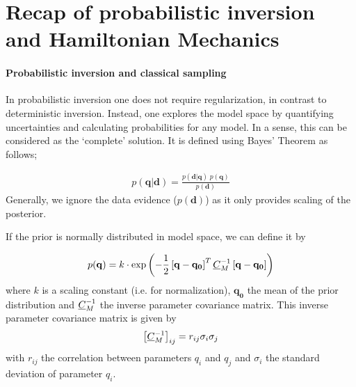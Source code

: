 \section{Recap of probabilistic inversion and Hamiltonian Mechanics}

\paragraph{Probabilistic inversion and classical sampling}
In probabilistic inversion one does not require regularization, in contrast to deterministic inversion. Instead, one explores the model space by quantifying uncertainties and calculating probabilities for any model. In a sense, this can be considered as the `complete' solution. It is defined using Bayes' Theorem as follows;

\begin{gather}
	p(\mathbf{q}|\mathbf{d}) = \frac{p(\mathbf{d}|\mathbf{q})\;p(\mathbf{q})}{ p(\mathbf{d})}
\end{gather}
Generally, we ignore the data evidence ($p(\mathbf{d})$) as it only provides scaling of the posterior.

If the prior is normally distributed in model space, we can define it by

\begin{gather}
	p(\mathbf{q}) = k \cdot \exp{\left( -\frac{1}{2} \left[ \mathbf{q} -\mathbf{q_0}\right]^T \ensuremath{\underline{C}}_M ^{-1}\left[ \mathbf{q} -  \mathbf{q_0}\right]\right)}
\end{gather}
where $k$ is a scaling constant (i.e. for normalization), $\mathbf{q_0}$ the mean of the prior distribution and $\underline{C}_M ^{-1}$ the inverse parameter covariance matrix. This inverse parameter covariance matrix is given by
\begin{gather}
	\left[ \underline{C}_M^{-1} \right]_{ij} = r_{ij} \sigma_i \sigma_j
\end{gather}
with $r_{ij}$ the correlation between parameters $q_i$ and $q_j$ and $\sigma_i$ the standard deviation of parameter $q_i$.

